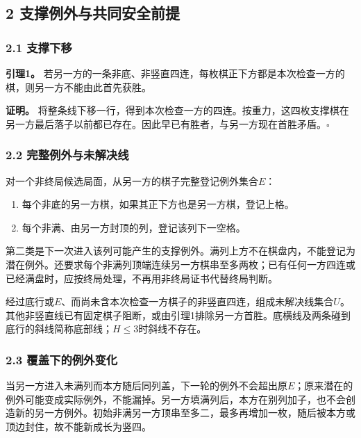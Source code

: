\documentclass[
  a4paper,
]{article}
\providecommand{\tightlist}{%
  \setlength{\itemsep}{0pt}\setlength{\parskip}{0pt}}
\begin{document}
\subsection{2
支撑例外与共同安全前提}\label{ux652fux6491ux4f8bux5916ux4e0eux5171ux540cux5b89ux5168ux524dux63d0}

\subsubsection{2.1 支撑下移}\label{ux652fux6491ux4e0bux79fb}

\textbf{引理1。}
若另一方的一条非底、非竖直四连，每枚棋正下方都是本次检查一方的棋，则另一方不能由此首先获胜。

\textbf{证明。}
将整条线下移一行，得到本次检查一方的四连。按重力，这四枚支撑棋在另一方最后落子以前都已存在。因此早已有胜者，与另一方现在首胜矛盾。\(\square\)

\subsubsection{2.2
完整例外与未解决线}\label{ux5b8cux6574ux4f8bux5916ux4e0eux672aux89e3ux51b3ux7ebf}

对一个非终局候选局面，从另一方的棋子完整登记例外集合\(E\)：

\begin{enumerate}
\def\labelenumi{\arabic{enumi}.}
\tightlist
\item
  每个非底的另一方棋，如果其正下方也是另一方棋，登记上格。
\item
  每个非满、由另一方封顶的列，登记该列下一空格。
\end{enumerate}

第二类是下一次进入该列可能产生的支撑例外。满列上方不在棋盘内，不能登记为潜在例外。还要求每个非满列顶端连续另一方棋串至多两枚；已有任何一方四连或已经满盘时，应按终局处理，不再用非终局证书代替终局判断。

经过底行或\(E\)、而尚未含本次检查一方棋子的非竖直四连，组成未解决线集合\(U\)。其他非竖直线已有固定棋子阻断，或由引理1排除另一方首胜。底横线及两条碰到底行的斜线简称底部线；\(H\le 3\)时斜线不存在。

\subsubsection{2.3
覆盖下的例外变化}\label{ux8986ux76d6ux4e0bux7684ux4f8bux5916ux53d8ux5316}

当另一方进入未满列而本方随后同列盖，下一轮的例外不会超出原\(E\)；原来潜在的例外可能变成实际例外，不能漏掉。另一方填满列后，本方在别列加子，也不会创造新的另一方例外。初始非满另一方顶串至多二，最多再增加一枚，随后被本方或顶边封住，故不能新成长为竖四。
\end{document}
